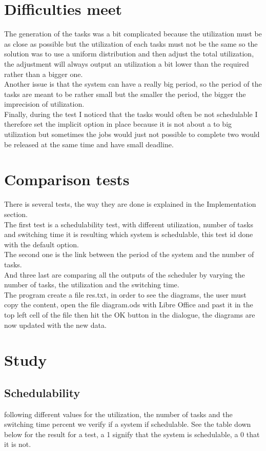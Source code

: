 \documentclass[a4paper,12pt]{article}
\begin{document}
\section{Difficulties meet}
The generation of the tasks was a bit complicated because the utilization must be as close as possible but the utilization of each tasks must not be the same so the solution was to use a uniform distribution and then adjust the total utilization, the adjustment will always output an utilization a bit lower than the required rather than a bigger one.\\
Another issue is that the system can have a really big period, so the period of the tasks are meant to be rather small but the smaller the period, the bigger the imprecision of utilization.\\
Finally, during the test I noticed that the tasks would often be not schedulable I therefore set the implicit option in place because it is not about a to big utilization but sometimes the jobs would just not possible to complete two would be released at the same time and have small deadline.

\section{Comparison tests}
There is several tests, the way they are done is explained in the Implementation section.\\
The first test is a schedulability test, with different utilization, number of tasks and switching time it is resulting which system is schedulable, this test id done with the default option.\\
The second one is the link between the period of the system and the number of tasks.\\
And three last are comparing all the outputs of the scheduler by varying the number of tasks, the utilization and the switching time.\\
The program create a file res.txt, in order to see the diagrams, the user must copy the content, open the file diagram.ods with Libre Office and past it in the top left cell of the file then hit the OK button in the dialogue, the diagrams are now updated with the new data.

\section{Study}
\subsection{Schedulability}
following different values for the utilization, the number of tasks and the switching time percent we verify if a system if schedulable. See the table down below for the result for a test, a 1 signify that the system is schedulable, a 0 that it is not.\\
\end{document}
